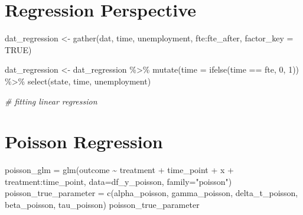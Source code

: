 \documentclass[
]{article}
\newenvironment{Shaded}{\begin{snugshade}}{\end{snugshade}}
\newcommand{\AttributeTok}[1]{\textcolor[rgb]{0.77,0.63,0.00}{#1}}
\newcommand{\CommentTok}[1]{\textcolor[rgb]{0.56,0.35,0.01}{\textit{#1}}}
\newcommand{\ConstantTok}[1]{\textcolor[rgb]{0.00,0.00,0.00}{#1}}
\newcommand{\DecValTok}[1]{\textcolor[rgb]{0.00,0.00,0.81}{#1}}
\newcommand{\FunctionTok}[1]{\textcolor[rgb]{0.00,0.00,0.00}{#1}}
\newcommand{\NormalTok}[1]{#1}
\newcommand{\OtherTok}[1]{\textcolor[rgb]{0.56,0.35,0.01}{#1}}
\newcommand{\SpecialCharTok}[1]{\textcolor[rgb]{0.00,0.00,0.00}{#1}}
\newcommand{\StringTok}[1]{\textcolor[rgb]{0.31,0.60,0.02}{#1}}
\begin{document}
\hypertarget{regression-perspective}{%
\section{Regression Perspective}\label{regression-perspective}}

\begin{Shaded}
\begin{Highlighting}[]
\NormalTok{dat\_regression }\OtherTok{\textless{}{-}} \FunctionTok{gather}\NormalTok{(dat, }
\NormalTok{                    time, }
\NormalTok{                    unemployment, }
\NormalTok{                    fte}\SpecialCharTok{:}\NormalTok{fte\_after, }
                    \AttributeTok{factor\_key =} \ConstantTok{TRUE}\NormalTok{) }

\NormalTok{dat\_regression }\OtherTok{\textless{}{-}}\NormalTok{ dat\_regression }\SpecialCharTok{\%\textgreater{}\%}
  \FunctionTok{mutate}\NormalTok{(}\AttributeTok{time =} \FunctionTok{ifelse}\NormalTok{(time }\SpecialCharTok{==} \StringTok{\textquotesingle{}fte\textquotesingle{}}\NormalTok{, }\DecValTok{0}\NormalTok{, }\DecValTok{1}\NormalTok{)) }\SpecialCharTok{\%\textgreater{}\%}
  \FunctionTok{select}\NormalTok{(state, time, unemployment)}


\CommentTok{\# fitting linear regression }
\end{Highlighting}
\end{Shaded}

\hypertarget{poisson-regression}{%
\section{Poisson Regression}\label{poisson-regression}}

\begin{Shaded}
\begin{Highlighting}[]
\NormalTok{poisson\_glm }\OtherTok{=} \FunctionTok{glm}\NormalTok{(outcome }\SpecialCharTok{\textasciitilde{}}\NormalTok{ treatment }\SpecialCharTok{+}\NormalTok{ time\_point }\SpecialCharTok{+}\NormalTok{ x }\SpecialCharTok{+}\NormalTok{ treatment}\SpecialCharTok{:}\NormalTok{time\_point, }
                  \AttributeTok{data=}\NormalTok{df\_y\_poisson, }\AttributeTok{family=}\StringTok{"poisson"}\NormalTok{)}
\NormalTok{poisson\_true\_parameter }\OtherTok{=} \FunctionTok{c}\NormalTok{(alpha\_poisson, gamma\_poisson, delta\_t\_poisson, beta\_poisson, tau\_poisson)}
\NormalTok{poisson\_true\_parameter}
\end{Highlighting}
\end{Shaded}
\end{document}
